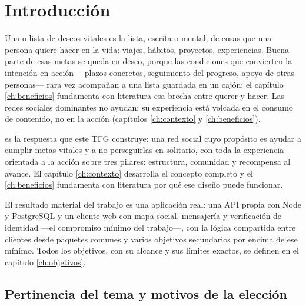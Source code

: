 
\chapter{Introducción}
\label{ch:introduccion}

Una  o lista de deseos vitales es la lista, escrita o mental, de cosas que una persona quiere hacer en la vida: viajes, hábitos, proyectos, experiencias.
Buena parte de esas metas se queda en deseo, porque las condiciones que convierten la intención en acción —plazos concretos, seguimiento del progreso, apoyo de otras personas— rara vez acompañan a una lista guardada en un cajón; el capítulo \ref{ch:beneficios} fundamenta con literatura esa brecha entre querer y hacer.
Las redes sociales dominantes no ayudan: su experiencia está volcada en el consumo de contenido, no en la acción (capítulos \ref{ch:contexto} y \ref{ch:beneficios}).

\bukit es la respuesta que este \ac{TFG} construye: una red social cuyo propósito es ayudar a cumplir metas vitales y a no perseguirlas en solitario, con toda la experiencia orientada a la acción sobre tres pilares: estructura, comunidad y recompensa al avance.
El capítulo \ref{ch:contexto} desarrolla el concepto completo y el \ref{ch:beneficios} fundamenta con literatura por qué ese diseño puede funcionar.

El resultado material del trabajo es una aplicación real: una \ac{API} propia con Node y PostgreSQL y un cliente web con mapa social, mensajería y verificación de identidad —el compromiso mínimo del trabajo—, con la lógica compartida entre clientes desde paquetes comunes y varios objetivos secundarios por encima de ese mínimo.
Todos los objetivos, con su alcance y sus límites exactos, se definen en el capítulo \ref{ch:objetivos}.

\section{Pertinencia del tema y motivos de la elección}
\label{sec:intro-motivos}

